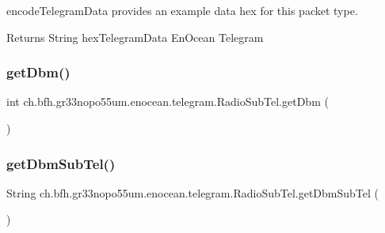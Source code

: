 encode\+Telegram\+Data provides an example data hex for this packet type.

\begin{DoxyReturn}{Returns}
String hex\+Telegram\+Data En\+Ocean Telegram 
\end{DoxyReturn}
\hypertarget{classch_1_1bfh_1_1gr33nopo55um_1_1enocean_1_1telegram_1_1_radio_sub_tel_a2a37e568970cf1a4c5280687833f7053}{}\label{classch_1_1bfh_1_1gr33nopo55um_1_1enocean_1_1telegram_1_1_radio_sub_tel_a2a37e568970cf1a4c5280687833f7053} 
\subsubsection{\texorpdfstring{get\+Dbm()}{getDbm()}}
{\footnotesize\ttfamily int ch.\+bfh.\+gr33nopo55um.\+enocean.\+telegram.\+Radio\+Sub\+Tel.\+get\+Dbm (\begin{DoxyParamCaption}{ }\end{DoxyParamCaption})}

\hypertarget{classch_1_1bfh_1_1gr33nopo55um_1_1enocean_1_1telegram_1_1_radio_sub_tel_ac3ab4400f9a8c782b4c5480521d543f1}{}\label{classch_1_1bfh_1_1gr33nopo55um_1_1enocean_1_1telegram_1_1_radio_sub_tel_ac3ab4400f9a8c782b4c5480521d543f1} 
\subsubsection{\texorpdfstring{get\+Dbm\+Sub\+Tel()}{getDbmSubTel()}}
{\footnotesize\ttfamily String ch.\+bfh.\+gr33nopo55um.\+enocean.\+telegram.\+Radio\+Sub\+Tel.\+get\+Dbm\+Sub\+Tel (\begin{DoxyParamCaption}{ }\end{DoxyParamCaption})}

\hypertarget{classch_1_1bfh_1_1gr33nopo55um_1_1enocean_1_1telegram_1_1_radio_sub_tel_a0e0ceead171474f593b75b914d622e74}{}\label{classch_1_1bfh_1_1gr33nopo55um_1_1enocean_1_1telegram_1_1_radio_sub_tel_a0e0ceead171474f593b75b914d622e74} 

